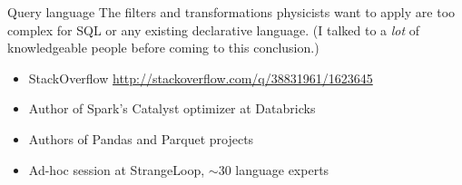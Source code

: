 \documentclass{beamer}
\begin{document}
\begin{frame}{Query language}
\small
\vspace{0.5 cm}
The filters and transformations physicists want to apply are too complex for SQL or any existing declarative language. (I talked to a {\it lot} of knowledgeable people before coming to this conclusion.)
\begin{itemize}
\item StackOverflow \textcolor{blue}{\scriptsize \url{http://stackoverflow.com/q/38831961/1623645}}
\item Author of Spark's Catalyst optimizer at Databricks
\item Authors of Pandas and Parquet projects
\item Ad-hoc session at StrangeLoop, $\sim$30 language experts
\end{itemize}

\vspace{0.5 cm}

\vspace{0.5 cm}
\end{frame}
\end{document}
